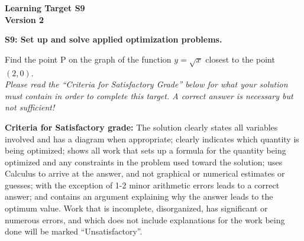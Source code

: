\documentclass[10pt]{article}
\begin{document}
	\vspace*{0in}

		\begin{center}
			\textbf{Learning Target S9 \\
			Version 2} 
		\end{center}


\begin{framed}
	\textbf{S9: Set up and solve applied optimization problems.}
\end{framed}

Find the point P on the graph of the function $y = \sqrt{x}$ closest to the point  $(2,0)$. \\

\emph{Please read the ``Criteria for Satisfactory Grade'' below for what your solution must contain in order to complete this target. A correct answer is necessary but not sufficient!} 




\vfill

\begin{small}
    \begin{framed}
        	\textbf{Criteria for Satisfactory grade:} The solution clearly states all variables involved and has a diagram when appropriate; clearly indicates which quantity is being optimized; shows all work that sets up a formula for the quantity being optimized and any constraints in the problem used toward the solution; uses Calculus to arrive at the answer, and not graphical or numerical estimates or guesses; with the exception of 1-2 minor arithmetic errors leads to a correct answer; and contains an argument explaining why the answer leads to the optimum value. Work that is incomplete, disorganized, has significant or numerous errors, and which does not include explanations for the work being done will be marked ``Unsatisfactory''. 
    \end{framed}

\end{small}
\end{document}
